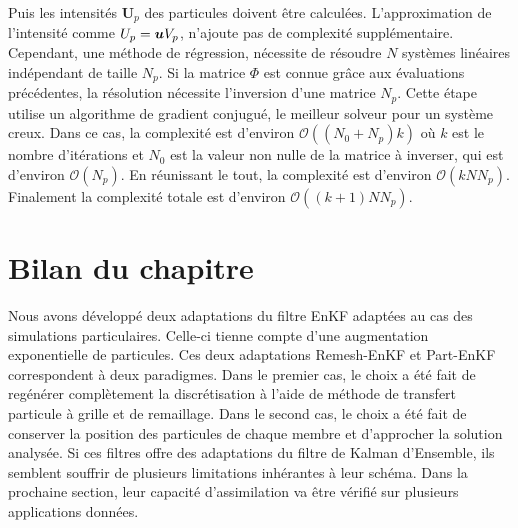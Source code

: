Puis les intensités $\bm U_p$ des particules doivent être calculées. L'approximation de l'intensité comme $U_p = \bm{u} V_p$, n'ajoute pas de complexité supplémentaire. Cependant, une méthode de régression, nécessite de résoudre $N$ systèmes linéaires indépendant de taille $N_p$. Si la matrice $\Phi$ est connue grâce aux évaluations précédentes, la résolution nécessite l'inversion d'une matrice $N_p$. Cette étape utilise un algorithme de gradient conjugué, le meilleur solveur pour un système creux. Dans ce cas, la complexité est d'environ $\mathcal{O}((N_0 + N_p) k)$ où $k$ est le nombre d'itérations et $N_0$ est la valeur non nulle de la matrice à inverser, qui est d'environ $\mathcal{O}(N_p)$. En réunissant le tout, la complexité est d'environ $\mathcal{O}(kNN_p)$. Finalement la complexité totale est d'environ $\mathcal{O}((k+1)NN_p)$.

\section{Bilan du chapitre}

Nous avons développé deux adaptations du filtre EnKF adaptées au cas des simulations particulaires. Celle-ci tienne compte d'une augmentation exponentielle de particules.
Ces deux adaptations Remesh-EnKF et Part-EnKF correspondent à deux paradigmes. Dans le premier cas, le choix a été fait de regénérer complètement la discrétisation à l'aide de méthode de transfert particule à grille et de remaillage. Dans le second cas, le choix a été fait de conserver la position des particules de chaque membre et d'approcher la solution analysée.
Si ces filtres offre des adaptations du filtre de Kalman d'Ensemble, ils semblent souffrir de plusieurs limitations inhérantes à leur schéma. Dans la prochaine section, leur capacité d'assimilation va être vérifié sur plusieurs applications données.

